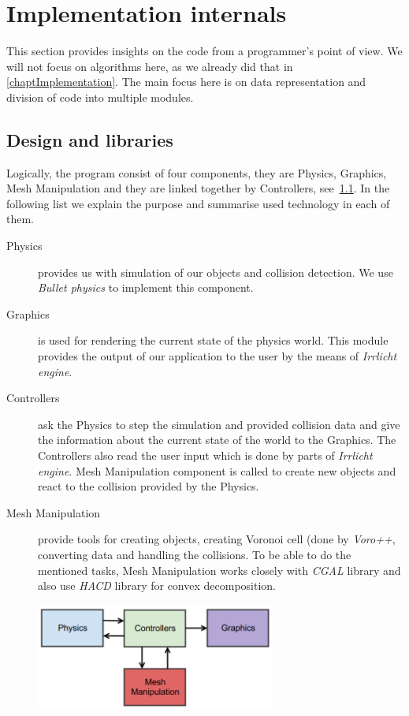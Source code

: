 \chapter{Implementation internals}
This section provides insights on the code from a programmer's point of view. We will not focus on algorithms here, as we already did that in \cref{chaptImplementation}. The main focus here is on data representation and division of code into multiple modules.

\section{Design and libraries}
Logically, the program consist of four components, they are Physics, Graphics, Mesh Manipulation and they are linked together by Controllers, see~\cref{fig:architecture}. In the following list we explain the purpose and summarise used technology in each of them.
\begin{description}
\item[Physics] provides us with simulation of our objects and collision detection. We use \emph{Bullet physics} to implement this component. 
\item[Graphics] is used for rendering the current state of the physics world. This module provides the output of our application to the user by the means of \emph{Irrlicht engine}.
\item[Controllers] ask the Physics to step the simulation and provided collision data and give the information about the current state of the world to the Graphics. The Controllers also read the user input which is done by parts of \emph{Irrlicht engine}. Mesh Manipulation component is called to create new objects and react to the collision provided by the Physics.
\item[Mesh Manipulation] provide tools for creating objects, creating Voronoi cell (done by \emph{Voro++}, converting data and handling the collisions. To be able to do the mentioned tasks, Mesh Manipulation works closely with \emph{CGAL} library and also use \emph{HACD} library for convex decomposition.
\end{description}

\begin{figure}
        \centering
        \includegraphics[width=0.7\textwidth]{img/architecture}
        \caption{}
        \label{fig:architecture}
\end{figure}

